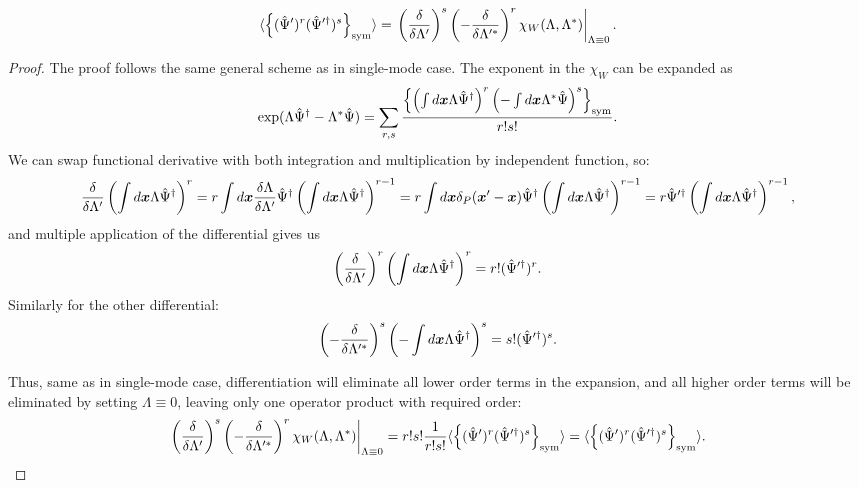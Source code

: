 \begin{lemma}
\label{lmm:formalism:func-wigner:moments-from-chi}
\[
	\langle \left\{  (\hat{\Psi}^\prime)^r (\hat{\Psi}^{\prime\dagger})^s  \right\}_{\mathrm{sym}} \rangle
	= \left.
		\left( \frac{\delta}{\delta \Lambda^\prime} \right)^s
		\left( -\frac{\delta}{\delta \Lambda^{\prime*}} \right)^r
		\chi_W (\Lambda, \Lambda^*)
	\right|_{\Lambda \equiv 0}.
\]
\end{lemma}
\begin{proof}
The proof follows the same general scheme as in single-mode case.
The exponent in the $\chi_W$ can be expanded as
\[
	\exp (\Lambda \hat{\Psi}^\dagger - \Lambda^* \hat{\Psi})
	= \sum_{r,s}
		\frac{
			\left\{ 
				\left( \int d\boldsymbol{x} \Lambda \hat{\Psi}^\dagger \right)^r
				\left( -\int d\boldsymbol{x} \Lambda^* \hat{\Psi} \right)^s
			 \right\}_{\mathrm{sym}}
		}
		{r!s!}.
\]
We can swap functional derivative with both integration and multiplication by independent function, so:
\[
	\frac{\delta}{\delta \Lambda^\prime} \left( \int d\boldsymbol{x} \Lambda \hat{\Psi}^\dagger \right)^r
	= r \int d\boldsymbol{x} \frac{\delta \Lambda}{\delta \Lambda^\prime} \hat{\Psi}^\dagger
		\left( \int d\boldsymbol{x} \Lambda \hat{\Psi}^\dagger \right)^{r-1}
	= r \int d\boldsymbol{x} \delta_P(\boldsymbol{x}^\prime - \boldsymbol{x}) \hat{\Psi}^\dagger
		\left( \int d\boldsymbol{x} \Lambda \hat{\Psi}^\dagger \right)^{r-1}
	= r \hat{\Psi}^{\prime\dagger} \left( \int d\boldsymbol{x} \Lambda \hat{\Psi}^\dagger \right)^{r-1},
\]
and multiple application of the differential gives us
\[
	\left( \frac{\delta}{\delta \Lambda^\prime} \right)^r
	\left( \int d\boldsymbol{x} \Lambda \hat{\Psi}^\dagger \right)^r
	= r! ( \hat{\Psi}^{\prime\dagger} )^r.
\]
Similarly for the other differential:
\[
	\left( -\frac{\delta}{\delta \Lambda^{\prime*}} \right)^s
	\left( -\int d\boldsymbol{x} \Lambda \hat{\Psi}^\dagger \right)^s
	= s! ( \hat{\Psi}^{\prime\dagger} )^s.
\]

Thus, same as in single-mode case,
differentiation will eliminate all lower order terms in the expansion,
and all higher order terms will be eliminated by setting $\Lambda \equiv 0$,
leaving only one operator product with required order:
\[
	\left.
		\left( \frac{\delta}{\delta \Lambda^\prime} \right)^s
		\left( -\frac{\delta}{\delta \Lambda^{\prime*}} \right)^r
		\chi_W (\Lambda, \Lambda^*)
	\right|_{\Lambda \equiv 0}
	= r! s! \frac{1}{r! s!}
		\langle \left\{  (\hat{\Psi}^\prime)^r (\hat{\Psi}^{\prime\dagger})^s  \right\}_{\mathrm{sym}} \rangle
	= \langle \left\{  (\hat{\Psi}^\prime)^r (\hat{\Psi}^{\prime\dagger})^s  \right\}_{\mathrm{sym}} \rangle.
	\qedhere
\]
\end{proof}

